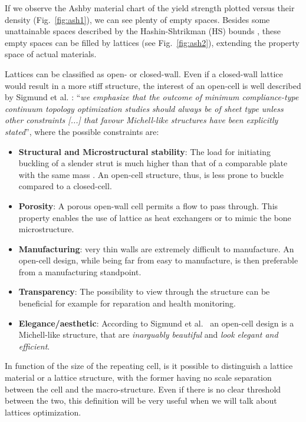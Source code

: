 If we observe the Ashby material chart  of the yield strength plotted versus their density (Fig.~\ref{fig:ash1}), we can see plenty of empty spaces. Besides some unattainable spaces described by the Hashin-Shtrikman (HS) bounds , these empty spaces can be filled by lattices (see Fig.~\ref{fig:ash2}), extending the property space of actual materials.

Lattices can be classified as open- or closed-wall. Even if a closed-wall lattice would result in a more stiff structure, the interest of an open-cell is well described by Sigmund et al. : ``\textit{we emphasize that the outcome of minimum compliance-type continuum topology optimization studies should always be of sheet type unless other constraints [...] that favour Michell-like structures have been explicitly stated}'', where the possible constraints are:
\begin{itemize}
    \item \textbf{Structural and Microstructural stability}: The load for initiating buckling of a slender strut is much higher than that of a comparable plate with the same mass . An open-cell structure, thus, is less prone to buckle compared to a closed-cell.
    \item \textbf{Porosity}: A porous open-wall cell permits a flow to pass through. This property enables the use of lattice as heat exchangers or to mimic the bone microstructure.
    \item \textbf{Manufacturing}: very thin walls are extremely difficult to manufacture. An open-cell design, while being far from easy to manufacture, is then preferable from a manufacturing standpoint. 
    \item \textbf{Transparency}: The possibility to view through the structure can be beneficial for example for reparation and health monitoring.
    \item \textbf{Elegance/aesthetic}: According to Sigmund et al.~\cite{sigmund_non-optimality_2016} an open-cell design is a Michell-like structure, that are \textit{inarguably beautiful} and \textit{look elegant and efficient}.
\end{itemize}

In function of the size of the repeating cell, is it possible to distinguish a lattice material or a lattice structure, with the former having no scale separation between the cell and the macro-structure. Even if there is no clear threshold between the two, this definition will be very useful when we will talk about lattices optimization.

